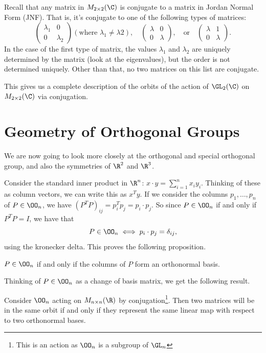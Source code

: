 \documentclass[a4]{scrreprt}
\newcommand{\newsection}{\section}
\begin{document}
\begin{example}
Recall that any matrix in $M_{2 \times 2}(\C)$ is conjugate to a matrix in Jordan Normal Form (JNF). That is, it's conjugate to one of the following types of matrices:
$$
\begin{pmatrix}
	\lambda_1 & 0 \\ 0 & \lambda_2
\end{pmatrix} (\text{where }\lambda_1 \neq \lambda 2), \quad \begin{pmatrix}
	\lambda & 0 \\ 0 & \lambda
\end{pmatrix}, \quad \text{or} \quad \begin{pmatrix}
	\lambda & 1 \\ 0 & \lambda
\end{pmatrix}.
$$
In the case of the first type of matrix, the values $\lambda_1$ and $\lambda_2$ are uniquely determined by the matrix (look at the eigenvalues), but the order is not determined uniquely. Other than that, no two matrices on this list are conjugate.

This gives us a complete description of the orbits of the action of $\GL_2(\C)$ on $M_{2 \times 2}(\C)$ via conjugation.
\end{example}

\newsection{Geometry of Orthogonal Groups}

We are now going to look more closely at the orthogonal and special orthogonal group, and also the symmetries of $\R^2$ and $\R^3$.

Consider the standard inner product in $\R^n$: $x \cdot y = \sum_{i = 1}^n x_i y_i$. Thinking of these as column vectors, we can write this as $x^T y$. If we consider the columns $p_1, \dots, p_n$ of $P \in \OO_n$, we have $(P^T P)_{ij} = p_i^T p_j = p_i \cdot p_j$. So since $P \in \OO_n$ if and only if $P^T P = I$, we have that
$$
P \in \OO_n \iff p_i \cdot p_j = \delta_{ij},
$$
using the kronecker delta. 
This proves the following proposition.

\begin{proposition}
	$P \in \OO_n$ if and only if the columns of $P$ form an orthonormal basis.
\end{proposition}

Thinking of $P \in \OO_n$ as a change of basis matrix, we get the following result.

\begin{proposition}
	Consider $\OO_n$ acting on $M_{n \times n}(\R)$ by conjugation\footnote{This is an action as $\OO_n$ is a subgroup of $\GL_n$}. Then two matrices will be in the same orbit if and only if they represent the same linear map with respect to two orthonormal bases.
\end{proposition}
\end{document}
